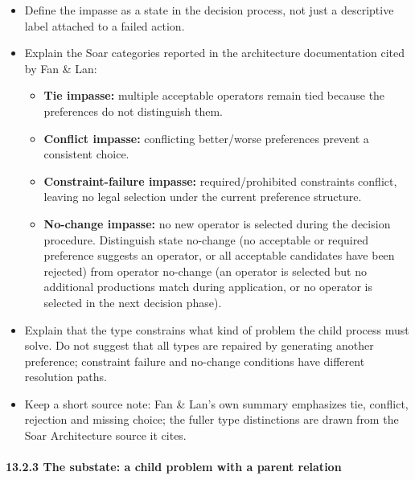 \begin{itemize}
\tightlist
\item
  Define the impasse as a state in the decision process, not just a descriptive label attached to a failed action.
\item
  Explain the Soar categories reported in the architecture documentation cited by Fan \& Lan:

  \begin{itemize}
  \tightlist
  \item
    \textbf{Tie impasse:} multiple acceptable operators remain tied because the preferences do not distinguish them.
  \item
    \textbf{Conflict impasse:} conflicting better/worse preferences prevent a consistent choice.
  \item
    \textbf{Constraint-failure impasse:} required/prohibited constraints conflict, leaving no legal selection under the current preference structure.
  \item
    \textbf{No-change impasse:} no new operator is selected during the decision procedure. Distinguish state no-change (no acceptable or required preference suggests an operator, or all acceptable candidates have been rejected) from operator no-change (an operator is selected but no additional productions match during application, or no operator is selected in the next decision phase).
  \end{itemize}
\item
  Explain that the type constrains what kind of problem the child process must solve. Do not suggest that all types are repaired by generating another preference; constraint failure and no-change conditions have different resolution paths.
\item
  Keep a short source note: Fan \& Lan's own summary emphasizes tie, conflict, rejection and missing choice; the fuller type distinctions are drawn from the Soar Architecture source it cites.
\end{itemize}

\paragraph{13.2.3 The substate: a child problem with a parent relation}\label{the-substate-a-child-problem-with-a-parent-relation}

